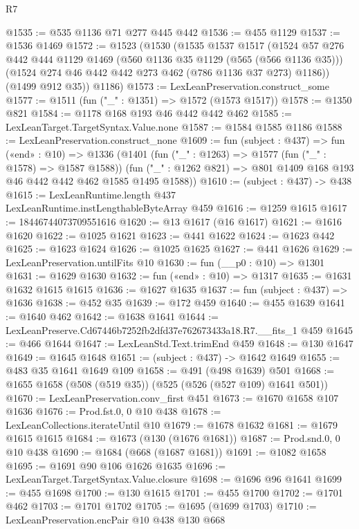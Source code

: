 \begin{lexlean}{R7}
\begin{coremodule}
@1535 := @535 @1136 @71 @277 @445 @442
@1536 := @455 @1129
@1537 := @1536 @1469
@1572 := @1523
    (@1530
      (@1535
        @1537
        @1517
        (@1524
          @57
          @276
          @442
          @444
          @1129
          @1469
          (@560 @1136 @35 @1129 (@565 (@566 @1136 @35)))
          (@1524 @274 @46 @442 @442 @273 @462 (@786 @1136 @37 @273) @1186))
        (@1499 @912 @35))
      @1186)
@1573 := LexLeanPreservation.construct_some
@1577 := @1511 (fun ("_" : @1351) => @1572 (@1573 @1517))
@1578 := @1350 @821
@1584 := @1178 @168 @193 @46 @442 @442 @462
@1585 := LexLeanTarget.TargetSyntax.Value.none
@1587 := @1584 @1585 @1186
@1588 := LexLeanPreservation.construct_none
@1609 := fun (subject : @437) =>
  fun («end» : @10) =>
  @1336
    (@1401
      (fun ("_" : @1263) => @1577 (fun ("_" : @1578) => @1587 @1588))
      (fun ("_" : @1262 @821) => @801 @1409 @168 @193 @46 @442 @442 @462 @1585 @1495 @1588))
@1610 := (subject : @437) -> @438
@1615 := LexLeanRuntime.length @437 LexLeanRuntime.instLengthableByteArray @459
@1616 := @1259 @1615
@1617 := 18446744073709551616
@1620 := @13 @1617 (@16 @1617)
@1621 := @1616 @1620
@1622 := @1025 @1621
@1623 := @441 @1622
@1624 := @1623 @442
@1625 := @1623 @1624
@1626 := @1025 @1625
@1627 := @441 @1626
@1629 := LexLeanPreservation.untilFits @10
@1630 := fun (__p0 : @10) => @1301
@1631 := @1629 @1630
@1632 := fun («end» : @10) => @1317
@1635 := @1631 @1632 @1615 @1615
@1636 := @1627 @1635
@1637 := fun (subject : @437) => @1636
@1638 := @452 @35
@1639 := @172 @459
@1640 := @455 @1639
@1641 := @1640 @462
@1642 := @1638 @1641
@1644 := LexLeanPreserve.Cd67446b7252fb2dfd37e762673433a18.R7.__fits_1 @459
@1645 := @466 @1644
@1647 := LexLeanStd.Text.trimEnd @459
@1648 := @130 @1647
@1649 := @1645 @1648
@1651 := (subject : @437) -> @1642 @1649
@1655 := @483 @35 @1641 @1649 @109
@1658 := @491 (@498 @1639) @501
@1668 := @1655 @1658 (@508 (@519 @35)) (@525 (@526 (@527 @109) @1641 @501))
@1670 := LexLeanPreservation.conv_first @451
@1673 := @1670 @1658 @107 @1636
@1676 := Prod.fst.{0, 0} @10 @438
@1678 := LexLeanCollections.iterateUntil @10
@1679 := @1678 @1632
@1681 := @1679 @1615 @1615
@1684 := @1673 (@130 (@1676 @1681))
@1687 := Prod.snd.{0, 0} @10 @438
@1690 := @1684 (@668 (@1687 @1681))
@1691 := @1082 @1658
@1695 := @1691 @90 @106 @1626 @1635
@1696 := LexLeanTarget.TargetSyntax.Value.closure
@1698 := @1696 @96 @1641
@1699 := @455 @1698
@1700 := @130 @1615
@1701 := @455 @1700
@1702 := @1701 @462
@1703 := @1701 @1702
@1705 := @1695 (@1699 @1703)
@1710 := LexLeanPreservation.encPair @10 @438 @130 @668

\end{coremodule}
\end{lexlean}
